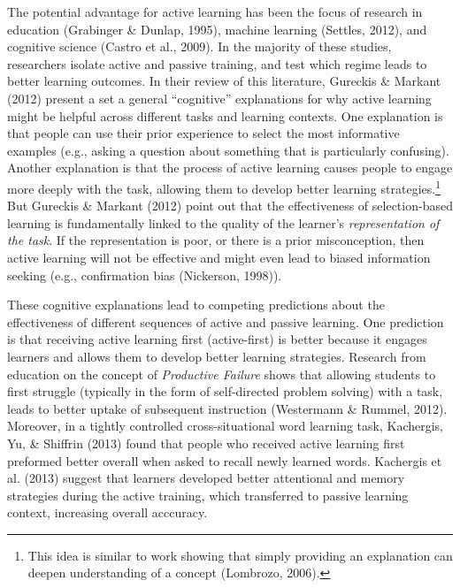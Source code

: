 \documentclass[10pt, letterpaper]{article}
\begin{document}
The potential advantage for active learning has been the focus of
research in education (Grabinger \& Dunlap, 1995), machine learning
(Settles, 2012), and cognitive science (Castro et al., 2009). In the
majority of these studies, researchers isolate active and passive
training, and test which regime leads to better learning outcomes. In
their review of this literature, Gureckis \& Markant (2012) present a
set a general ``cognitive'' explanations for why active learning might
be helpful across different tasks and learning contexts. One explanation
is that people can use their prior experience to select the most
informative examples (e.g., asking a question about something that is
particularly confusing). Another explanation is that the process of
active learning causes people to engage more deeply with the task,
allowing them to develop better learning strategies.\footnote{This idea
  is similar to work showing that simply providing an explanation can
  deepen understanding of a concept (Lombrozo, 2006).} But Gureckis \&
Markant (2012) point out that the effectiveness of selection-based
learning is fundamentally linked to the quality of the learner's
\emph{representation of the task}. If the representation is poor, or
there is a prior misconception, then active learning will not be
effective and might even lead to biased information seeking (e.g.,
confirmation bias (Nickerson, 1998)).

These cognitive explanations lead to competing predictions about the
effectiveness of different sequences of active and passive learning. One
prediction is that receiving active learning first (active-first) is
better because it engages learners and allows them to develop better
learning strategies. Research from education on the concept of
\emph{Productive Failure} shows that allowing students to first struggle
(typically in the form of self-directed problem solving) with a task,
leads to better uptake of subsequent instruction (Westermann \& Rummel,
2012). Moreover, in a tightly controlled cross-situational word learning
task, Kachergis, Yu, \& Shiffrin (2013) found that people who received
active learning first preformed better overall when asked to recall
newly learned words. Kachergis et al. (2013) suggest that learners
developed better attentional and memory strategies during the active
training, which transferred to passive learning context, increasing
overall acccuracy.
\end{document}
